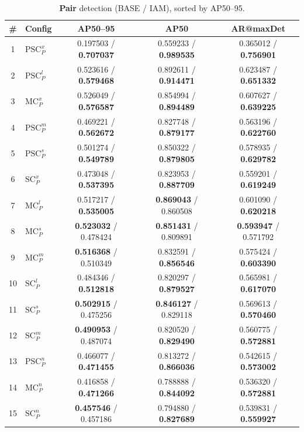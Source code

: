 \begin{table}[t]
 \centering
 \scriptsize
 \setlength{\tabcolsep}{4pt}
 \renewcommand{\arraystretch}{1.25}
 \caption{\textbf{Pair} detection (BASE / IAM), sorted by AP50--95.}
 \begin{tabular}{|c|l|c|c|c|}
 \hline
 \textbf{\#} & Config & AP50--95 & AP50 & AR@maxDet \\
 \hline 1 & $\mathrm{PSC}_{P}^{x}$ & 0.197503 / \textbf{0.707037} & 0.559233 / \textbf{0.989535} & 0.365012 / \textbf{0.756901} \\
 \hline 2 & $\mathrm{PSC}_{P}^{l}$ & 0.523616 / \textbf{0.579468} & 0.892611 / \textbf{0.914471} & 0.623487 / \textbf{0.651332} \\
 \hline 3 & $\mathrm{MC}_{P}^{x}$ & 0.526049 / \textbf{0.576587} & 0.854994 / \textbf{0.894489} & 0.607627 / \textbf{0.639225} \\
 \hline 4 & $\mathrm{PSC}_{P}^{m}$ & 0.469221 / \textbf{0.562672} & 0.827748 / \textbf{0.879177} & 0.563196 / \textbf{0.622760} \\
 \hline 5 & $\mathrm{PSC}_{P}^{s}$ & 0.501274 / \textbf{0.549789} & 0.850322 / \textbf{0.879805} & 0.578935 / \textbf{0.629782} \\
 \hline 6 & $\mathrm{SC}_{P}^{x}$ & 0.473048 / \textbf{0.537395} & 0.823953 / \textbf{0.887709} & 0.559201 / \textbf{0.619249} \\
 \hline 7 & $\mathrm{MC}_{P}^{l}$ & 0.517217 / \textbf{0.535005} & \textbf{0.869043} / 0.860508 & 0.601090 / \textbf{0.620218} \\
 \hline 8 & $\mathrm{MC}_{P}^{s}$ & \textbf{0.523032} / 0.478424 & \textbf{0.851431} / 0.809891 & \textbf{0.593947} / 0.571792 \\
 \hline 9 & $\mathrm{MC}_{P}^{m}$ & \textbf{0.516368} / 0.510349 & 0.832591 / \textbf{0.856546} & 0.575424 / \textbf{0.603390} \\
 \hline 10 & $\mathrm{SC}_{P}^{l}$ & 0.484346 / \textbf{0.512818} & 0.820297 / \textbf{0.879527} & 0.565981 / \textbf{0.617070} \\
 \hline 11 & $\mathrm{SC}_{P}^{s}$ & \textbf{0.502915} / 0.475256 & \textbf{0.846127} / 0.829118 & 0.569613 / \textbf{0.570460} \\
 \hline 12 & $\mathrm{SC}_{P}^{m}$ & \textbf{0.490953} / 0.487074 & 0.820520 / \textbf{0.829490} & 0.560775 / \textbf{0.572881} \\
 \hline 13 & $\mathrm{PSC}_{P}^{n}$ & 0.466077 / \textbf{0.471455} & 0.813272 / \textbf{0.866036} & 0.542615 / \textbf{0.573002} \\
 \hline 14 & $\mathrm{MC}_{P}^{n}$ & 0.416858 / \textbf{0.471266} & 0.788888 / \textbf{0.844092} & 0.536320 / \textbf{0.572881} \\
 \hline 15 & $\mathrm{SC}_{P}^{n}$ & \textbf{0.457546} / 0.457186 & 0.794880 / \textbf{0.827689} & 0.539831 / \textbf{0.559927} \\
 \hline
 \end{tabular}
 \label{tab:pairs}
\end{table}

